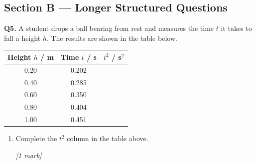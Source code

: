 \subsection*{Section B — Longer Structured Questions}

\begin{tcolorbox}[colback=white, colframe=midblue, breakable]

\begin{minipage}{\linewidth}
\textbf{Q5.} A student drops a ball bearing from rest and measures the time $t$ it takes to fall a height $h$. The results are shown in the table below.
\vspace{0.5em}
\begin{center}
\renewcommand{\arraystretch}{1.4}
\begin{tabular}{|c|c|c|}
\hline
\textbf{Height $h$ / m} & \textbf{Time $t$ / s} & \textbf{$t^2$ / s$^2$} \\
\hline
0.20 & 0.202 & \\
0.40 & 0.285 & \\
0.60 & 0.350 & \\
0.80 & 0.404 & \\
1.00 & 0.451 & \\
\hline
\end{tabular}
\end{center}
\vspace{0.5em}
\end{minipage}

\begin{enumerate}[label=(\alph*)]
  \item \begin{minipage}[t]{\linewidth}
  Complete the $t^2$ column in the table above.
  \par\hfill\textit{[1 mark]}
  \vspace{0.5cm}
  \end{minipage}


\end{enumerate}
\end{tcolorbox}
